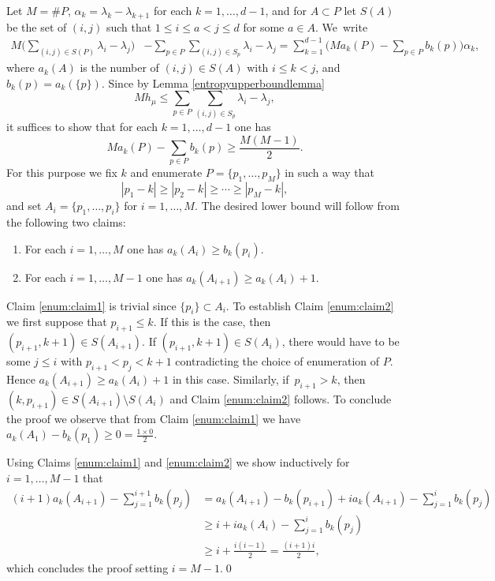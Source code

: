 \documentclass[10pt]{amsart}
\begin{document}
Let \(M= \#P\), \(\alpha_k = \lambda_{k} - \lambda_{k+1}\) for each \(k = 1,\ldots, d-1\), and for \(A \subset P\) let \(S(A)\) be the set of \((i,j)\) such that \(1 \le i \le a < j \le d\) for some \(a \in A\). We~write
\begin{align*}
M \biggl(\sum_{(i,j) \in S(P)}\lambda_i - \lambda_j\biggr) &- \sum_{p \in P}\sum_{(i,j) \in S_p}\lambda_i - \lambda_j
= \sum_{k = 1}^{d-1} \biggl(Ma_k(P) - \sum_{p \in P}b_k(p)\biggr)\alpha_k,
\end{align*}
where \(a_k(A)\) is the number of \((i,j) \in S(A)\) with \(i \le k < j\), and \(b_k(p) = a_k(\lbrace p\rbrace)\).
Since by Lemma \ref{entropyupperboundlemma}
\[
M h_\mu \le \sum_{p \in P}\sum_{(i,j) \in S_p}\lambda_i - \lambda_j,
\]
it suffices to show that for each \(k = 1,\ldots, d-1\) one has
\[
M a_k(P) - \sum_{p \in P}b_k(p) \ge \frac{M(M-1)}{2}.
\]
For this purpose we fix \(k\) and enumerate \(P = \lbrace p_1,\ldots, p_{M} \rbrace\) in such a way that
\[
|p_1 -k| \ge |p_2 -k| \ge \cdots \ge |p_{M}-k|,
\]
and set \(A_i = \lbrace p_1,\ldots, p_i\rbrace\) for \(i = 1,\ldots,M\).
The desired lower bound will follow from the following two claims:
\begin{enumerate}
\item\label{enum:claim1} For each \(i = 1,\ldots, M\) one has \(a_k(A_i) \ge b_k(p_i)\).
\item\label{enum:claim2} For each \(i = 1,\ldots, M-1\) one has \(a_k(A_{i+1}) \ge a_k(A_i) + 1\).
\end{enumerate}
Claim \eqref{enum:claim1} is trivial since \(\lbrace p_i\rbrace \subset A_i\).
To establish Claim \eqref{enum:claim2} we first suppose that \(p_{i+1} \le k\). If this is the case, then \((p_{i+1},k+1) \in S(A_{i+1})\). If \((p_{i+1},k+1) \in S(A_i)\), there would have to be some \(j \le i\) with \(p_{i+1} < p_j < k+1\) contradicting the choice of enumeration of \(P\). Hence \(a_k(A_{i+1}) \ge a_k(A_i) + 1\) in this case. Similarly, if~\(p_{i+1} > k\), then \((k,p_{i+1}) \in S(A_{i+1}) \setminus S(A_i)\) and Claim \eqref{enum:claim2} follows.
To conclude the proof we observe that from Claim \eqref{enum:claim1} we have \(a_k(A_1) - b_k(p_1) \ge 0 = \frac{1 \times 0}{2}\).

Using Claims \eqref{enum:claim1} and \eqref{enum:claim2} we show inductively for \(i = 1,\ldots, M-1\) that
\begin{align*}(i+1)a_k(A_{i+1}) - \sum_{j = 1}^{i+1}b_k(p_j) &= a_k(A_{i+1}) - b_k(p_{i+1}) + ia_k(A_{i+1}) - \sum_{j = 1}^i b_k(p_j)
\\[
-8pt] & \ge i + i a_k(A_i) - \sum_{j = 1}^i b_k(p_j)
\\ & \ge i + \frac{i(i-1)}{2} = \frac{(i+1)i}{2},
\end{align*}
which concludes the proof setting \(i = M-1\).\qed
\end{document}
